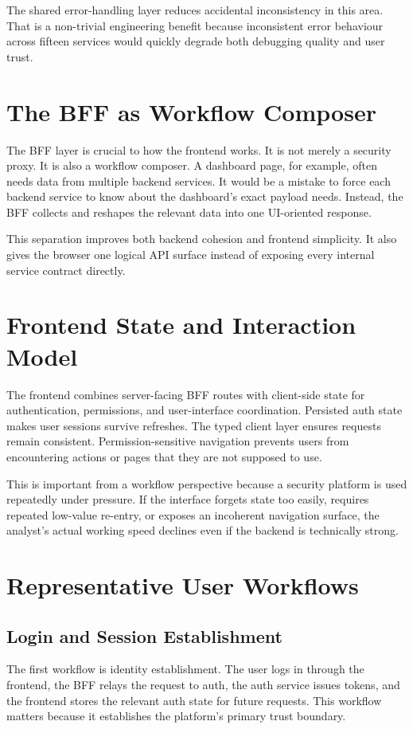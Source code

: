 The shared error-handling layer reduces accidental inconsistency in this area. That is a non-trivial engineering benefit because inconsistent error behaviour across fifteen services would quickly degrade both debugging quality and user trust.

\section{The BFF as Workflow Composer}
The BFF layer is crucial to how the frontend works. It is not merely a security proxy. It is also a workflow composer. A dashboard page, for example, often needs data from multiple backend services. It would be a mistake to force each backend service to know about the dashboard's exact payload needs. Instead, the BFF collects and reshapes the relevant data into one UI-oriented response.

This separation improves both backend cohesion and frontend simplicity. It also gives the browser one logical API surface instead of exposing every internal service contract directly.

\section{Frontend State and Interaction Model}
The frontend combines server-facing BFF routes with client-side state for authentication, permissions, and user-interface coordination. Persisted auth state makes user sessions survive refreshes. The typed client layer ensures requests remain consistent. Permission-sensitive navigation prevents users from encountering actions or pages that they are not supposed to use.

This is important from a workflow perspective because a security platform is used repeatedly under pressure. If the interface forgets state too easily, requires repeated low-value re-entry, or exposes an incoherent navigation surface, the analyst's actual working speed declines even if the backend is technically strong.

\section{Representative User Workflows}
\subsection{Login and Session Establishment}
The first workflow is identity establishment. The user logs in through the frontend, the BFF relays the request to auth, the auth service issues tokens, and the frontend stores the relevant auth state for future requests. This workflow matters because it establishes the platform's primary trust boundary.

